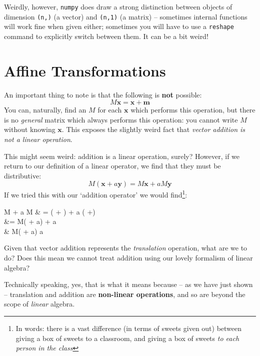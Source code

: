 \documentclass[a4paper,openany,11pt]{book}
\renewcommand\vec[1]{\boldsymbol{\mathbf{#1}}}
\begin{document}
					Weirdly, however, \verb|numpy| does draw a strong distinction between objects of dimension \verb|(n,)| (a vector) and \verb|(n,1)| (a matrix) -- sometimes internal functions will work fine when given either; sometimes you will have to use a \verb|reshape| command to explicitly switch between them. It can be a bit weird!

		
	
				\section{Affine Transformations}\label{S:Affine}

					An important thing to note is that the following is \textbf{not} possible:
					\begin{equation}
						M \vec{x} = \vec{x} + \vec{m} 
					\end{equation}
					You can, naturally, find an $M$ for each $\vec{x}$ which performs this operation, but there is no \textit{general} matrix which always performs this operation: you cannot write $M$ without knowing $\vec{x}$. This exposes the slightly weird fact that \textit{vector addition is not a linear operation}. 
					
					This might seem weird: addition is a linear operation, surely? However, if we return to our definition of a linear operator, we find that they must be distributive:
					\begin{equation}
						M\left( \vec{x} + a\vec{y}\right) = M \vec{x} + a M\vec{y} 
					\end{equation}
					If we tried this with our `addition operator' we would find\footnote{In words: there is a vast difference (in terms of sweets given out) between giving a box of sweets to a classroom, and giving a box of sweets \textit{to each person in the class}}:
					\begin{spalign}
						M \vec{x} + a M\vec{y} & = \left(\vec{x} + \vec{m}\right) + a \left( \vec{y} +\vec{m}\right) 
						\\
						&= M\left( \vec{x} + a\vec{y}\right) + a\vec{y}
						\\
						& \neq M\left( \vec{x} + a\vec{y}\right)  a 
					\end{spalign}
					 Given that vector addition represents the \textit{translation} operation, what are we to do? Does this mean we cannot treat addition using our lovely formalism of linear algebra?
					
					Technically speaking, yes, that is what it means because -- as we have just shown -- translation and addition are \textbf{non-linear operations}, and so are beyond the scope of \textit{linear} algebra.
\end{document}
